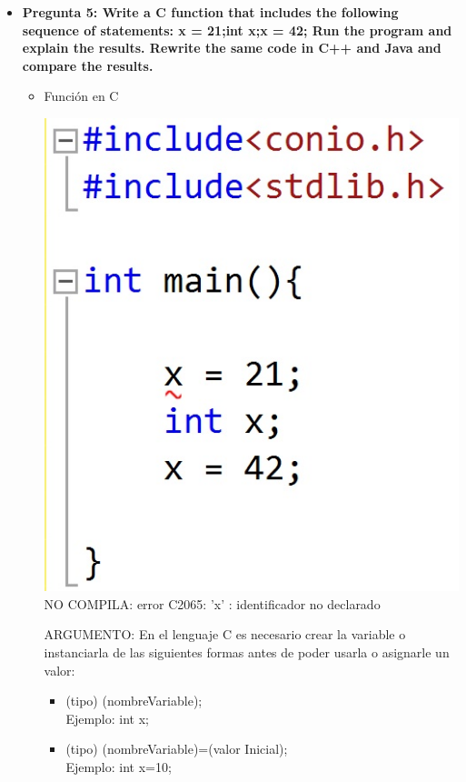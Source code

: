 \documentclass[12pt,oneside]{article}
\begin{document}
\begin{itemize}
				\item {\bf Pregunta 5: Write a C function that includes the following sequence of statements: x = 21;int x;x = 42; Run the program and explain the results. Rewrite the same code in C++ and Java and compare the results.}
					\begin{itemize}
						\item {Función en C}
							\begin{center}
							\includegraphics[scale=0.3]{Imagenes/1.jpg}\\
							NO COMPILA: error C2065: 'x' : identificador no declarado
							\end{center}
							ARGUMENTO: En el lenguaje C es necesario crear la variable o instanciarla de las siguientes formas antes de poder usarla o asignarle un valor: 
							\begin{itemize}
								\item{(tipo) (nombreVariable);}
									\\Ejemplo: int x;
								\item{(tipo) (nombreVariable)=(valor Inicial);}		
									\\Ejemplo: int x=10;							
							\end{itemize}


\end{itemize}
\end{itemize}
\end{document}
